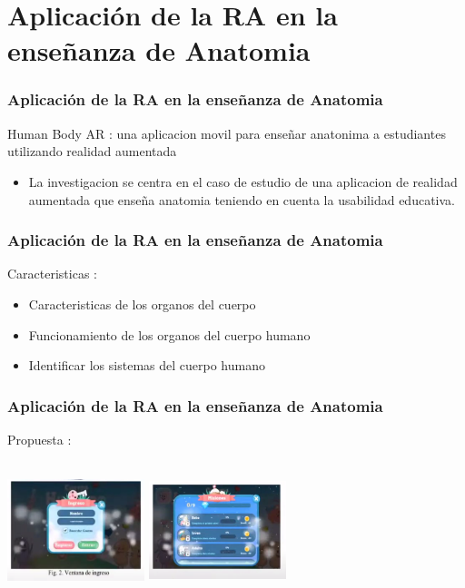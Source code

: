 \documentclass[11pt]{beamer}
\begin{document}
\section{Aplicación de la RA en la enseñanza de Anatomia}
\begin{frame}
\frametitle{Aplicación de la RA en la enseñanza de Anatomia}
\center Human Body AR : una aplicacion movil para enseñar anatonima a estudiantes utilizando realidad aumentada
\center
\begin{itemize}
\item La investigacion se centra en el caso de estudio de una aplicacion de realidad aumentada que enseña anatomia teniendo en cuenta la usabilidad educativa.
\end{itemize}
\end{frame}


\begin{frame}
\frametitle{Aplicación de la RA en la enseñanza de Anatomia}
\center Caracteristicas : 
\center
\begin{itemize}
\item Caracteristicas de los organos del cuerpo
\item Funcionamiento de los organos del cuerpo humano
\item Identificar los sistemas del cuerpo humano
\end{itemize}
\end{frame}



\begin{frame}
\frametitle{Aplicación de la RA en la enseñanza de Anatomia}
\center Propuesta : 
\center
\begin{itemize}
\end{itemize}
\includegraphics[width=4cm, height=4cm]{img/ingreso.png}
\includegraphics[width=4cm, height=4cm]{img/misiones.png}
\end{frame}
\end{document}
